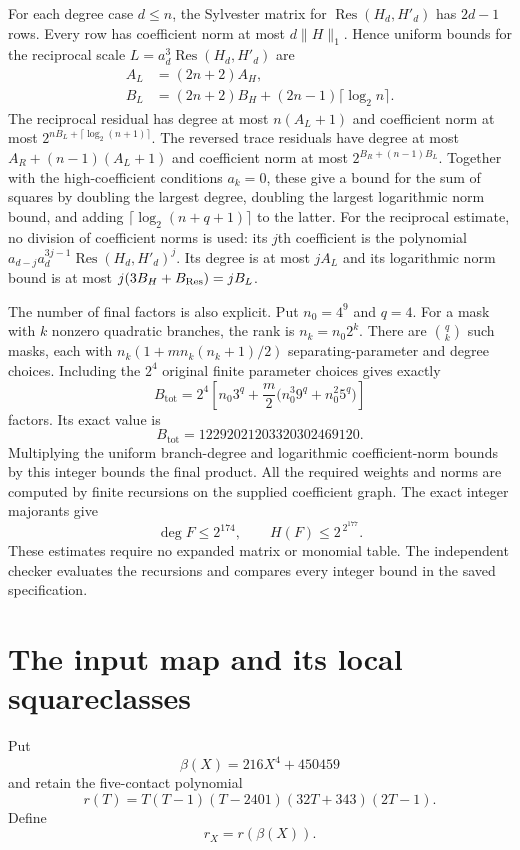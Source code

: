 \documentclass[11pt,a4paper]{article}
\theoremstyle{definition}
\theoremstyle{remark}
\begin{document}
For each degree case $d\le n$, the Sylvester matrix for
$\operatorname{Res}(H_d,H'_d)$ has $2d-1$ rows. Every row has
coefficient norm at most $d\|H\|_1$. Hence uniform bounds for the
reciprocal scale $L=a_d^3\operatorname{Res}(H_d,H'_d)$ are
\begin{align*}
 A_L&=(2n+2)A_H,\\
 B_L&=(2n+2)B_H+(2n-1)\lceil\log_2 n\rceil.
\end{align*}
The reciprocal residual has degree at most $n(A_L+1)$ and coefficient
norm at most $2^{nB_L+\lceil\log_2(n+1)\rceil}$. The reversed trace
residuals have degree at most $A_R+(n-1)(A_L+1)$ and coefficient norm
at most $2^{B_R+(n-1)B_L}$. Together with the high-coefficient
conditions $a_k=0$, these give a bound for the sum of squares by
doubling the largest degree, doubling the largest logarithmic norm
bound, and adding $\lceil\log_2(n+q+1)\rceil$ to the latter.
For the reciprocal estimate, no division of coefficient norms is used:
its $j$th coefficient is the polynomial
$a_{d-j}a_d^{3j-1}\operatorname{Res}(H_d,H'_d)^j$.
Its degree is at most $jA_L$ and its logarithmic norm bound is at most
$j(3B_H+B_{\rm Res})=jB_L$.

The number of final factors is also explicit. Put $n_0=4^9$ and $q=4$.  For a mask with $k$ nonzero quadratic branches, the rank is
$n_k=n_0 2^k$.  There are $\binom qk$ such masks, each with
$n_k(1+mn_k(n_k+1)/2)$ separating-parameter and degree choices.
Including the $2^4$ original finite parameter choices gives exactly
\[
 B_{\mathrm{tot}}=2^4\left[
 n_0 3^q+\frac m2\bigl(n_0^3 9^q+n_0^2 5^q\bigr)\right]
\]
factors. Its exact value is
\[
                     B_{\mathrm{tot}}=12292021203320302469120.
\]
Multiplying the uniform branch-degree and logarithmic coefficient-norm
bounds by this integer bounds the final product. All the required
weights and norms are computed by finite recursions on the supplied
coefficient graph. The exact integer majorants give
\[
                         \deg F\le2^{174},\qquad
                         H(F)\le2^{\,2^{177}}.
\]
These estimates require no expanded matrix or monomial table. The
independent checker evaluates the recursions and compares every
integer bound in the saved specification.
\section{The input map and its local squareclasses}
\label{sec:scalar-correction-free}

Put
\[
                         \beta(X)=216X^4+450459
\]
and retain the five-contact polynomial
\[
 r(T)=T(T-1)(T-2401)(32T+343)(2T-1).
\]
Define
\[
                         r_X=r(\beta(X)).
\]
\end{document}
